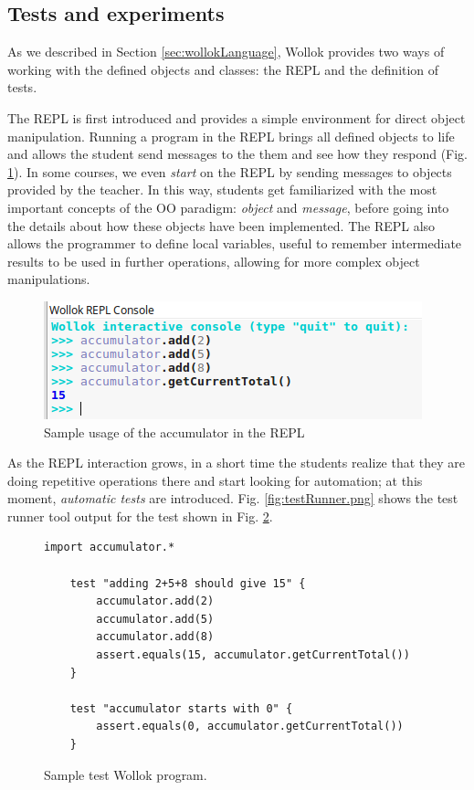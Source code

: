 \subsection{Tests and experiments}
\label{sec:testing}
As we described in Section \ref{sec:wollokLanguage}, Wollok provides two ways of working with the defined objects and classes: the REPL and the definition of tests.

The REPL is first introduced and provides a simple environment for direct object manipulation.
Running a program in the REPL brings all defined objects to life and allows the student send messages to the them and see how they respond (\cf Fig. \ref{fig:repl}).
In some courses, we even \emph{start} on the REPL by sending messages to objects provided by the teacher.
In this way, students get familiarized with the most important concepts of the OO paradigm: \emph{object} and \emph{message}, 
before going into the details about how these objects have been implemented.
The REPL also allows the programmer to define local variables, 
useful to remember intermediate results to be used in further operations, 
allowing for more complex object manipulations.

\begin{figure}[ht]
\vspace{-2mm}
 \centering
 \includegraphics[scale=0.55]{images/accumulator-repl.png}
\vspace{-3mm}
\caption{Sample usage of the accumulator in the REPL}
\label{fig:repl}
\vspace{-5mm}
\end{figure}

\medskip
As the REPL interaction grows, in a short time the students realize that they are doing repetitive operations there and start looking for automation;
at this moment, \emph{automatic tests} are introduced.
Fig. \ref{fig:testRunner.png} shows the test runner tool output for the test shown in Fig. \ref{fig:test}.

\begin{figure}[ht]
\vspace{-3mm}
\centering
\begin{lstlisting}[language=Wollok]
 	import accumulator.*

	test "adding 2+5+8 should give 15" {
		accumulator.add(2)
		accumulator.add(5)
		accumulator.add(8)
		assert.equals(15, accumulator.getCurrentTotal())		
	}
   
	test "accumulator starts with 0" {
		assert.equals(0, accumulator.getCurrentTotal())
	}\end{lstlisting}
\vspace{-3mm}
\caption{Sample test Wollok program.}
\label{fig:test}
\vspace{-3mm}
\end{figure}

